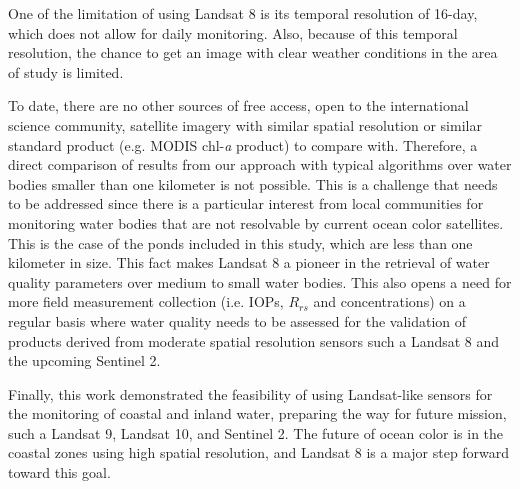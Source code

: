 One of the limitation of using Landsat 8 is its temporal resolution of 16-day, which does not allow for daily monitoring. Also, because of this temporal resolution, the chance to get an image with clear weather conditions in the area of study is limited.

To date, there are no other sources of free access, open to the international science community, satellite imagery with similar spatial resolution or similar standard product (e.g. MODIS chl-{\it a} product) to compare with. Therefore, a direct comparison of results from our approach with typical algorithms over water bodies smaller than one kilometer is not possible. This is a challenge that needs to be addressed since there is a particular interest from local communities for monitoring water bodies that are not resolvable by current ocean color satellites. This is the case of the ponds included in this study, which are less than one kilometer in size. This fact makes Landsat 8 a pioneer in the retrieval of water quality parameters over medium to small water bodies. This also opens a need for more field measurement collection (i.e. IOPs, $R_{rs}$ and concentrations) on a regular basis where water quality needs to be assessed for the validation of products derived from moderate spatial resolution sensors such a Landsat 8 and the upcoming Sentinel 2. 

Finally, this work demonstrated the feasibility of using Landsat-like sensors for the monitoring of coastal and inland water, preparing the way for future mission, such a Landsat 9, Landsat 10, and Sentinel 2. The future of ocean color is in the coastal zones using high spatial resolution, and Landsat 8 is a major step forward toward this goal.